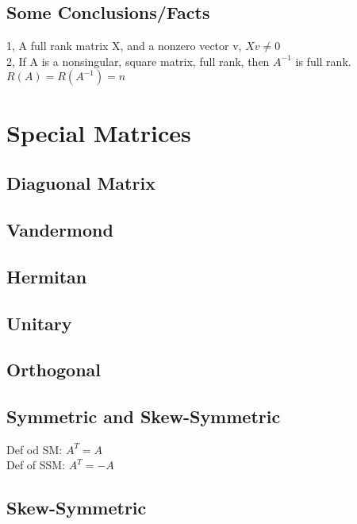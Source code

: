\documentclass{article}
\begin{document}
\subsection*{Some Conclusions/Facts}
1, A full rank matrix X, and a nonzero vector v, $Xv \neq 0$\\
2, If A is a nonsingular, square matrix, full rank, then $A^{-1}$ is full rank. $R(A) = R(A^{-1})=n$\\



\section{Special Matrices}
\subsection*{Diaguonal Matrix}
\subsection*{Vandermond}
\subsection*{Hermitan}
\subsection*{Unitary}
\subsection*{Orthogonal}
\subsection*{Symmetric and Skew-Symmetric}
Def od SM:
$A^T = A$\\

Def of SSM:
$A^T = -A$\\

\subsection*{Skew-Symmetric}
\end{document}
